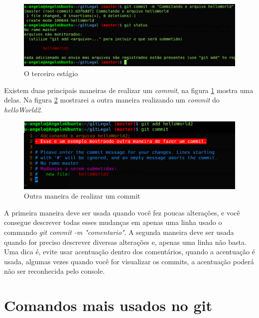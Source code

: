 \documentclass[12pt,openright,oneside,a4paper,english,brazil]{abntex2}
\begin{document}
\begin{figure}[h]
	\caption{\label{estagio3}O terceiro estágio}
	\begin{center}
		\includegraphics[width=1\linewidth]{estagio3}
	\end{center}
\end{figure}

Existem duas principais maneiras de realizar um \textit{commit}, na figura \ref{estagio3} mostra uma delas. Na figura \ref{commit} mostrarei a outra maneira realizando um \textit{commit} do \textit{helloWorld2}. 

\begin{figure}[h]
	\caption{\label{commit}Outra maneira de realizar um commit}
	\begin{center}
		\includegraphics[width=1\linewidth]{commit2}
	\end{center}
\end{figure}

A primeira maneira deve ser usada quando você fez poucas alterações, e você consegue descrever todas esses mudanças em apenas uma linha usado o commando \textit{git commit -m "comentario"}. A segunda maneira deve ser usada quando for preciso descrever diversas alterações e, apenas uma linha não basta. Uma dica é, evite usar acentuação dentro dos comentários, quando a acentuação é usada, algumas vezes quando você for visualizar os commits, a acentuação poderá não ser reconhecida pelo console.

\chapter{Comandos mais usados no git}
\end{document}
